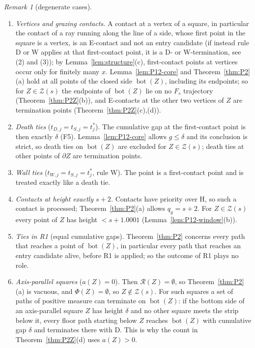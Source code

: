 \documentclass[11pt]{amsart}
\newcommand{\cR}{\mathcal R}
\newcommand{\cZ}{\mathcal Z}
\newcommand{\Bot}{\operatorname{bot}}
\newcommand{\Fs}{F_{s}}
\theoremstyle{definition}
\theoremstyle{remark}
\newtheorem{remark}[theorem]{Remark}
\numberwithin{equation}{section}
\begin{document}
\begin{remark}[degenerate cases]\label{rem:P12-degenerate}
\begin{enumerate}[label=\textup{(\arabic*)}]
\item \emph{Vertices and grazing contacts.} A contact at a vertex of a square, in particular the contact of a ray running along the line of a side, whose first point in the square is a vertex, is an E-contact and not an entry candidate (if instead rule D or W applies at that first-contact point, it is a D- or W-termination, see (2) and (3)); by Lemma~\ref{lem:structure}(c), first-contact points at vertices occur only for finitely many $x$. Lemma~\ref{lem:P12-core} and Theorem~\ref{thm:P2}(a) hold at all points of the closed side $\Bot(Z)$, including its endpoints; so for $Z\in\cZ(s)$ the endpoints of $\Bot(Z)$ lie on no $\Fs$ trajectory (Theorem~\ref{thm:P2Z}(b)), and E-contacts at the other two vertices of $Z$ are termination points (Theorem~\ref{thm:P2Z}(c),(d)).
\item \emph{Death ties} ($t_{D,j}=t_{S,j}=t^*_j$). The cumulative gap at the first-contact point is then exactly $\delta$ (F5). Lemma~\ref{lem:P12-core} allows $g\le\delta$ and its conclusion is strict, so death ties on $\Bot(Z)$ are excluded for $Z\in\cZ(s)$; death ties at other points of $\partial Z$ are termination points.
\item \emph{Wall ties} ($t_{W,j}=t_{S,j}=t^*_j$, rule W). The point is a first-contact point and is treated exactly like a death tie.
\item \emph{Contacts at height exactly $s+2$.} Contacts have priority over H, so such a contact is processed; Theorem~\ref{thm:P2}(a) allows $q_y=s+2$. For $Z\in\cZ(s)$ every point of $Z$ has height $<s+1.0001$ (Lemma~\ref{lem:P12-window}(b)).
\item \emph{Ties in R1} (equal cumulative gaps). Theorem~\ref{thm:P2} concerns every path that reaches a point of $\Bot(Z)$, in particular every path that reaches an entry candidate alive, before R1 is applied; so the outcome of R1 plays no role.
\item \emph{Axis-parallel squares} ($a(Z)=0$). Then $\cR(Z)=\emptyset$, so Theorem~\ref{thm:P2}(a) is vacuous, and $\Phi(Z)=\emptyset$, so $Z\notin\cZ(s)$. For such squares a set of paths of positive measure can terminate on $\Bot(Z)$: if the bottom side of an axis-parallel square $Z$ has height $\delta$ and no other square meets the strip below it, every floor path starting below $Z$ reaches $\Bot(Z)$ with cumulative gap $\delta$ and terminates there with D. This is why the count in Theorem~\ref{thm:P2Z}(d) uses $a(Z)>0$.

\end{enumerate}
\end{remark}
\end{document}
